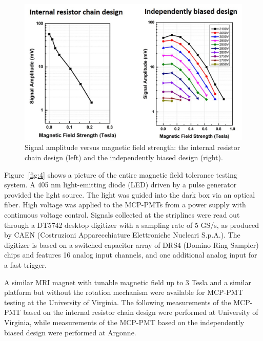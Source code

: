 \documentclass[preprint,5p]{elsarticle}
\begin{document}
\begin{figure}[tbp]
\centering \includegraphics[scale=0.7]{fig/Figure5.jpg}
\caption{Signal amplitude versus magnetic 
   field strength: the internal resistor chain design (left) and the independently 
   biased design (right).
   } \label{fig:5}
\end{figure}



Figure~\ref{fig:4} shows a picture of the entire magnetic field tolerance testing 
system.  A 405 nm light-emitting diode (LED) driven by a pulse generator provided
the light source. The light was guided into the dark box via an 
optical fiber.  High voltage was applied to the MCP-PMTs from a power supply 
with continuous voltage control. Signals collected at the striplines were read 
out through a DT5742 desktop digitizer \cite{19} with a sampling rate of 5 GS/s, as
produced by CAEN (Costruzioni Apparecchiature Elettroniche Nucleari S.p.A.).  
The digitizer is based on a switched capacitor array of DRS4 (Domino Ring 
Sampler) chips \cite{20} and features 16 analog input channels, and one additional analog 
input for a fast trigger. 

A similar MRI magnet with tunable magnetic field up to 3 Tesla and a similar platform but without the rotation
mechanism were available for MCP-PMT testing at the University of Virginia. 
The following measurements of the MCP-PMT based on the internal resistor chain 
design were performed at University of Virginia, while
measurements of the MCP-PMT based on the independently biased design were performed at Argonne.
\end{document}
